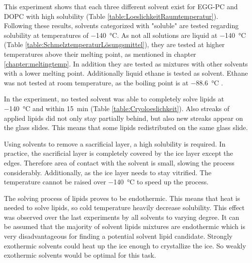 This experiment shows that each three different solvent exist for EGG-PC and DOPC with high solubility (Table \ref{table:LoeslichkeitRaumtemperatur}). Following these results, solvents categorized with "soluble" are tested regarding solubility at temperatures of \SI{-140}{\degreeCelsius}. As not all solutions are liquid at \SI{-140}{\degreeCelsius} (Table \ref{table:SchmelztemperaturLösungsmittel}), they are tested at higher temperatures above their melting point, as mentioned in chapter \ref{chapter:meltingtemp}. In addition they are tested as mixtures with other solvents with a lower melting point. Additionally liquid ethane is tested as solvent. Ethane was not tested at room temperature, as the boiling point is at \SI{-88.6}{\degreeCelsius} \cite{PubChem.29.08.2023}.

In the experiment, no tested solvent was able to completely solve lipids at \SI{-140}{\degreeCelsius} and within \SI{15}{\minute} (Table \ref{table:Cryoloeslichkeit}). Also streaks of applied lipids did not only stay partially behind, but also new streaks appear on the glass slides. This means that some lipids redistributed on the same glass slide.

Using solvents to remove a sacrificial layer, a high solubility is required. In practice, the sacrificial layer is completely covered by the ice layer except the edges. Therefore area of contact with the solvent is small, slowing the process considerably. Additionally, as the ice layer needs to stay vitrified. The temperature cannot be raised over \SI{-140}{\degreeCelsius} to speed up the process.

The solving process of lipids proves to be endothermic. This means that heat is needed to solve lipids, so cold temperature heavily decrease solubility. This effect was observed over the last experiments by all solvents to varying degree. It can be assumed that the majority of solvent lipids mixtures are endothermic which is very disadvantageous for finding a potential solvent lipid candidate. Strongly exothermic solvents could heat up the ice enough to crystallize the ice. So weakly exothermic solvents would be optimal for this task.

